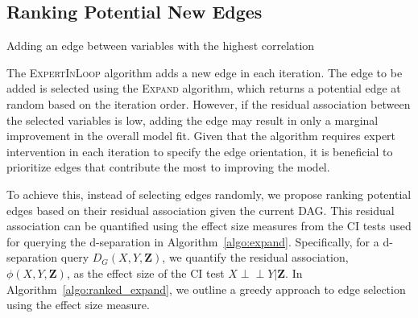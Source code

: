 \documentclass{uai2025} %
\def\ci{\perp\!\!\!\!\!\perp}
\begin{document}
\subsection{Ranking Potential New Edges}
\label{sec:ranking}

\begin{algorithm}[h]
\DontPrintSemicolon
\SetAlgoLined
{}
\caption{Adding an edge between variables with the highest correlation}
\label{algo:ranked_expand}
\end{algorithm}

The \textsc{ExpertInLoop} algorithm adds a new edge in each iteration. The edge
to be added is selected using the \textsc{Expand} algorithm, which returns a
potential edge at random based on the iteration order. However, if the residual
association between the selected variables is low, adding the edge may result
in only a marginal improvement in the overall model fit. Given that the
algorithm requires expert intervention in each iteration to specify the edge
orientation, it is beneficial to prioritize edges that contribute the most to
improving the model.

To achieve this, instead of selecting edges randomly, we propose ranking
potential edges based on their residual association given the current DAG. This
residual association can be quantified using the effect size measures from the
CI tests used for querying the d-separation in Algorithm~\ref{algo:expand}.
Specifically, for a d-separation query $ D_G(X, Y, \mathbf{Z}) $, we quantify
the residual association, $ \phi(X, Y, \bm{Z}) $, as the effect size of the CI
test $ X \ci Y \rvert \bm{Z} $. In Algorithm~\ref{algo:ranked_expand}, we
outline a greedy approach to edge selection using the effect size measure. 
\end{document}
